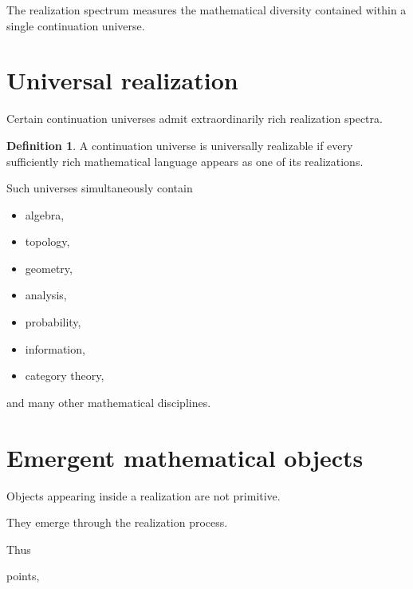\documentclass[13pt,openany]{book}
\theoremstyle{plain}
\theoremstyle{definition}
\newtheorem{definition}{Definition}[chapter]
\begin{document}
The realization spectrum measures the mathematical diversity contained within a single continuation universe.


\section{Universal realization}

Certain continuation universes admit extraordinarily rich realization spectra.

\begin{definition}

A continuation universe is universally realizable if every sufficiently rich mathematical language appears as one of its realizations.

\end{definition}

Such universes simultaneously contain

\begin{itemize}

\item algebra,

\item topology,

\item geometry,

\item analysis,

\item probability,

\item information,

\item category theory,

\end{itemize}

and many other mathematical disciplines.


\section{Emergent mathematical objects}

Objects appearing inside a realization are not primitive.

They emerge through the realization process.

Thus

points,
\end{document}
